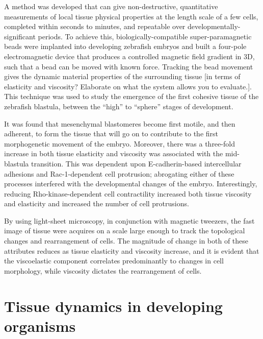 A method was developed that can give non-destructive, quantitative measurements of local tissue physical properties at the length scale of a few cells, completed within seconds to minutes, and repeatable over developmentally-significant periods.
To achieve this, biologically-compatible super-paramagnetic beads were implanted into developing zebrafish embryos and built a four-pole electromagnetic device that produces a controlled magnetic field gradient in 3D, such that a bead can be moved with known force.
Tracking the bead movement gives the dynamic material properties of the surrounding tissue [in terms of elasticity and viscosity? Elaborate on what the system allows you to evaluate.].
This technique was used to study the emergence of the first cohesive tissue of the zebrafish blastula, between the “high” to “sphere” stages of development.

It was found that mesenchymal blastomeres become first motile, and then adherent, to form the tissue that will go on to contribute to the first morphogenetic movement of the embryo.
Moreover, there was a three-fold increase in both tissue elasticity and viscosity was associated with the mid-blastula transition.
This was dependent upon E-cadherin-based intercellular adhesions and Rac-1-dependent cell protrusion; abrogating either of these processes interfered with the developmental changes of the embryo.
Interestingly, reducing Rho-kinase-dependent cell contractility increased both tissue viscosity and elasticity and increased the number of cell protrusions.

By using light-sheet microscopy, in conjunction with magnetic tweezers, the fast image of tissue were acquires on a scale large enough to track the topological changes and rearrangement of cells.
The magnitude of change in both of these attributes reduces as tissue elasticity and viscosity increase, and it is evident that the viscoelastic component correlates predominantly to changes in cell morphology, while viscosity dictates the rearrangement of cells.


\section{Tissue dynamics in developing organisms}


